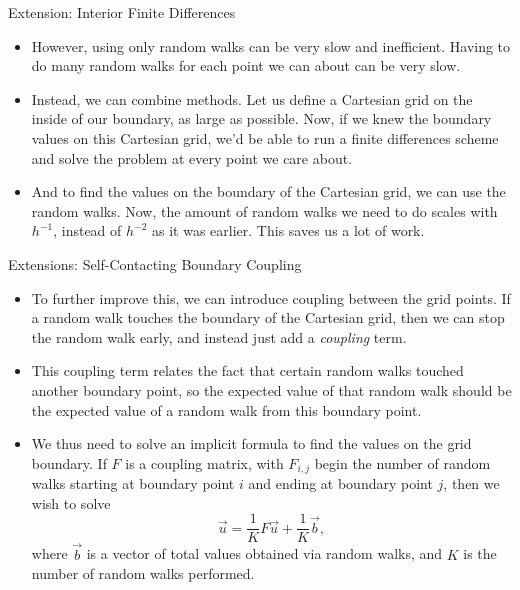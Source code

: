 \documentclass{beamer}
\newcommand\mat[1]{#1}
\begin{document}
\begin{frame}{Extension: Interior Finite Differences}
\begin{itemize}
\item However, using only random walks can be very slow and inefficient.
Having to do many random walks for each point we can about can be very slow.
\item Instead, we can combine methods.
Let us define a Cartesian grid on the inside of our boundary,
as large as possible.
Now, if we knew the boundary values on this Cartesian grid,
we'd be able to run a finite differences scheme
and solve the problem at every point we care about.
\item And to find the values on the boundary of the Cartesian grid,
we can use the random walks.
Now, the amount of random walks we need to do scales with $h^{-1}$,
instead of $h^{-2}$ as it was earlier.
This saves us a lot of work.
\end{itemize}
\end{frame}

\begin{frame}{Extensions: Self-Contacting Boundary Coupling}
\begin{itemize}
\item To further improve this,
we can introduce coupling between the grid points.
If a random walk touches the boundary of the Cartesian grid,
then we can stop the random walk early,
and instead just add a \emph{coupling} term.
\item This coupling term relates the fact that certain random walks
touched another boundary point, so the expected value of that random walk
should be the expected value of a random walk from this boundary point.
\item We thus need to solve an implicit formula
to find the values on the grid boundary.
If $\mat{F}$ is a coupling matrix,
with $F_{i,j}$ begin the number of random walks
starting at boundary point $i$ and ending at boundary point $j$,
then we wish to solve
$$\vec{u}=\frac{1}{K}\mat{F}\vec{u}+\frac{1}{K}\vec{b},$$
where $\vec{b}$ is a vector of total values obtained via random walks,
and $K$ is the number of random walks performed.
\end{itemize}
\end{frame}

\end{document}

